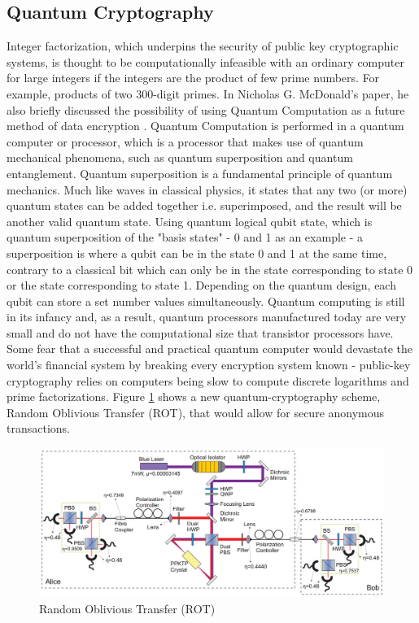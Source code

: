 \documentclass[journal]{IEEEtran}
\begin{document}
\subsection{\textbf{Quantum Cryptography}}
Integer factorization, which underpins the security of public key cryptographic systems, is thought to be computationally infeasible with an ordinary computer for large integers if the integers are the product of few prime numbers. For example, products of two 300-digit primes. In Nicholas G. McDonald's paper, he also briefly discussed the possibility of using Quantum Computation as a future method of data encryption \cite{encryption_research}. Quantum Computation is performed in a quantum computer or processor, which is a processor that makes use of quantum mechanical phenomena, such as quantum superposition and quantum entanglement. Quantum superposition is a fundamental principle of quantum mechanics. Much like waves in classical physics, it states that any two (or more) quantum states can be added together i.e. superimposed, and the result will be another valid quantum state. Using quantum logical qubit state, which is quantum superposition of the "basis states" - 0 and 1 as an example - a superposition is where a qubit can be in the state 0 and 1 at the same time, contrary to a classical bit which can only be in the state corresponding to state 0 or the state corresponding to state 1. Depending on the quantum design, each qubit can store a set number values simultaneously. Quantum computing is still in its infancy and, as a result, quantum processors manufactured today are very small and do not have the computational size that transistor processors have. Some fear that a successful and practical quantum computer would devastate the world's financial system by breaking every encryption system known - public-key cryptography relies on computers being slow to compute discrete logarithms and prime factorizations. Figure \ref{fig:rot} shows a new quantum-cryptography scheme, Random Oblivious Transfer (ROT), that would allow for secure anonymous transactions.

\newline
\begin{figure}[!h]
    \centering
    \includegraphics[scale=.35]{ROT-experiment}
    \caption{Random Oblivious Transfer (ROT)}
    \label{fig:rot}
\end{figure}
\end{document}
